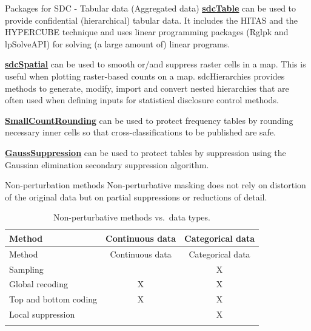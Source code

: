 \documentclass[
  ignorenonframetext,
  aspectratio=169,
]{beamer}
\begin{document}
\begin{frame}{Packages for SDC - Tabular data (Aggregated data)}
\protect\hypertarget{packages-for-sdc---tabular-data-aggregated-data}{}
\href{https://cran.r-project.org/web/packages/sdcTable/index.html}{\color{blue}\underline{\textbf{sdcTable}}}
can be used to provide confidential (hierarchical) tabular data. It
includes the HITAS and the HYPERCUBE technique and uses linear
programming packages (Rglpk and lpSolveAPI) for solving (a large amount
of) linear programs.

\href{https://cran.r-project.org/web/packages/sdcSpatial/index.html}{\color{blue}\underline{\textbf{sdcSpatial}}}
can be used to smooth or/and suppress raster cells in a map. This is
useful when plotting raster-based counts on a map. sdcHierarchies
provides methods to generate, modify, import and convert nested
hierarchies that are often used when defining inputs for statistical
disclosure control methods.

\href{https://cran.r-project.org/web/packages/SmallCountRounding/index.html}{\color{blue}\underline{\textbf{SmallCountRounding}}}
can be used to protect frequency tables by rounding necessary inner
cells so that cross-classifications to be published are safe.

\href{https://cran.r-project.org/web/packages/GaussSuppression/index.html}{\color{blue}\underline{\textbf{GaussSuppression}}}
can be used to protect tables by suppression using the Gaussian
elimination secondary suppression algorithm.
\end{frame}

\begin{frame}{Non-perturbation methods}
\protect\hypertarget{non-perturbation-methods}{}
Non-perturbative masking does not rely on distortion of the original
data but on partial suppressions or reductions of detail.

\begin{longtable}[]{@{}lcc@{}}
\caption{Non-perturbative methods vs.~data types.}\tabularnewline
\toprule\noalign{}
Method & Continuous data & Categorical data \\
\midrule\noalign{}
\endfirsthead
\toprule\noalign{}
Method & Continuous data & Categorical data \\
\midrule\noalign{}
\endhead
Sampling & & X \\
Global recoding & X & X \\
Top and bottom coding & X & X \\
Local suppression & & X \\
\bottomrule\noalign{}
\end{longtable}
\end{frame}
\end{document}
